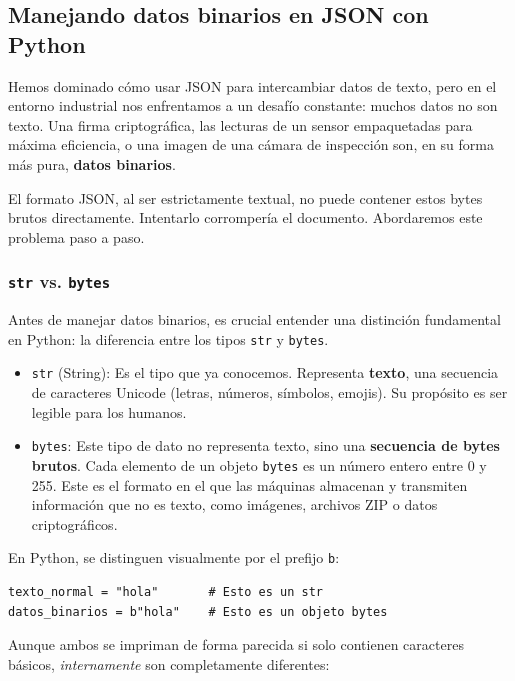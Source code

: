\newpage
\subsection{Manejando datos binarios en JSON con Python}

Hemos dominado cómo usar JSON para intercambiar datos de texto, pero en el entorno industrial nos enfrentamos a un desafío constante: muchos datos no son texto. Una firma criptográfica, las lecturas de un sensor empaquetadas para máxima eficiencia, o una imagen de una cámara de inspección son, en su forma más pura, \textbf{datos binarios}.

El formato JSON, al ser estrictamente textual, no puede contener estos bytes brutos directamente. Intentarlo corrompería el documento. Abordaremos este problema paso a paso.

\subsubsection{\texttt{str} vs. \texttt{bytes}}

Antes de manejar datos binarios, es crucial entender una distinción fundamental en Python: la diferencia entre los tipos \texttt{str} y \texttt{bytes}.

\begin{itemize}
    \item \texttt{str} (String): Es el tipo que ya conocemos. Representa \textbf{texto}, una secuencia de caracteres Unicode (letras, números, símbolos, emojis). Su propósito es ser legible para los humanos.

    \item \texttt{bytes}: Este tipo de dato no representa texto, sino una \textbf{secuencia de bytes brutos}. Cada elemento de un objeto \texttt{bytes} es un número entero entre 0 y 255. Este es el formato en el que las máquinas almacenan y transmiten información que no es texto, como imágenes, archivos ZIP o datos criptográficos.
\end{itemize}

En Python, se distinguen visualmente por el prefijo \texttt{b}:
\begin{lstlisting}[style=PythonStyle]
texto_normal = "hola"       # Esto es un str
datos_binarios = b"hola"    # Esto es un objeto bytes
\end{lstlisting}

Aunque ambos se impriman de forma parecida si solo contienen caracteres básicos, \textit{internamente} son completamente diferentes:

